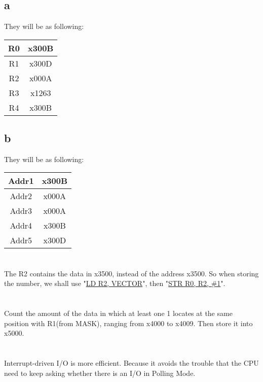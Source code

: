 \documentclass[11pt,a4paper]{article}
\begin{document}
	\section{}
	\subsection*{a}
	They will be as following:\par
	\begin{tabular}{|c|c|}
		\hline 
		R0 & x300B \\ 
		\hline 
		R1 & x300D \\ 
		\hline 
		R2 & x000A \\ 
		\hline 
		R3 & x1263 \\ 
		\hline 
		R4 & x300B \\ 
		\hline 
	\end{tabular} 
	\subsection*{b}
	They will be as following:\par
	\begin{tabular}{|c|c|}
		\hline 
		Addr1 & x300B \\ 
		\hline 
		Addr2 & x000A \\ 
		\hline 
		Addr3 & x000A \\ 
		\hline 
		Addr4 & x300B \\ 
		\hline 
		Addr5 & x300D \\ 
		\hline 
	\end{tabular} 

	\section{}
	The R2 contains the data in x3500, instead of the address x3500. So when storing the number, we shall use "\underline{LD R2, VECTOR}", then "\underline{STR R0, R2, \#1}".\par
	
	\section{}
	Count the amount of the data in which at least one 1 locates at the same position with R1(from MASK), ranging from x4000 to x4009. Then store it into x5000.
	
	\section{}
	Interrupt-driven I/O is more efficient. Because it avoids the trouble that the CPU need to keep asking whether there is an I/O in Polling Mode.\par
	
\end{document}

